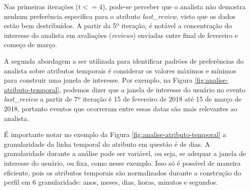 Nas primeiras iterações ($t <= 4$), pode-se perceber que o analista não demostra nenhum preferência específica para o atributo {\em last\_review}, visto que os dados estão bem destribuídos. A partir da 5º iteração, é notável a concentração do interesse do analista em avaliações ({\em reviews}) enviadas entre final de fevereiro e começo de março.

A segunda abordagem a ser utilizada para identificar padrões de preferências do analista sobre atributos temporais é considerar os valores máximos e mínimos para construir uma janela de interesse. Por exemplo, na Figura \ref{fig:analise-atributo-temporal}, podemos dizer que a janela de interesse do usuário no evento {\em last\_review} a partir de 7º iteração é 15 de fevereiro de 2018 até 15 de março de 2018, portanto eventos que ocorreram entre essas datas são mais relevantes ao analista.

É importante notar no exemplo da Figura \ref{fig:analise-atributo-temporal} a granularidade da linha temporal do atributo em questão é de dias. A granularidade durante a análise pode ser variável, ou seja, se adequar a janela de interesse do usuário, ou fixa, como nesse exemplo. Isso só é possível de maneira eficiente, pois os atributos temporais são normalizados durante a construção do perfil em 6 granularidade: anos, meses, dias, horas, minutos e segundos.